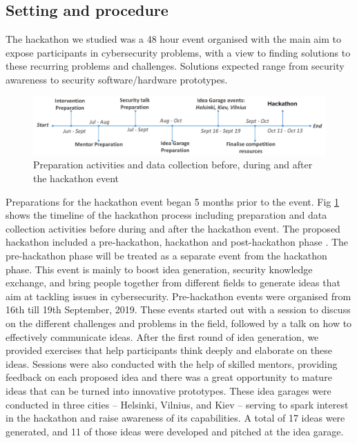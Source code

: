 \documentclass[runningheads]{llncs}
\begin{document}
\subsection{Setting and procedure}
The hackathon we studied was a 48 hour event organised with the main aim to expose participants in cybersecurity problems, with a view to finding solutions to these recurring problems and challenges. %
Solutions expected range from security awareness to security software/hardware prototypes. 
\begin{figure}[h]
  \centering
  \includegraphics[width=\linewidth]{timelinehack.pdf}
  \caption{Preparation activities and data collection before, during and after the hackathon event} \label{Fig:timeline} 
\end{figure}
Preparations for the hackathon event began 5 months prior to the event. Fig \ref{Fig:timeline} shows the timeline of the hackathon process including preparation and data collection activities before during and after the hackathon event. The proposed hackathon included a pre-hackathon, hackathon and post-hackathon phase \cite{komssi2014hackathons}. The pre-hackathon phase will be treated as a separate event from the hackathon phase. This event is mainly to boost idea generation, security knowledge exchange, and bring people together from different fields to generate ideas that aim at tackling issues in cybersecurity. Pre-hackathon events were organised from 16th till 19th September, 2019. These events started out with a session to discuss on the different challenges and problems in the field, followed by a talk on how to effectively communicate ideas. After the first round of idea generation, we provided exercises that help participants think deeply and elaborate on these ideas. Sessions were also conducted with the help of skilled mentors, providing feedback on each proposed idea and there was a great opportunity to mature ideas that can be turned into innovative prototypes. These idea garages were conducted in three cities -- Helsinki, Vilnius, and Kiev -- serving to spark interest in the hackathon and raise awareness of its capabilities. A total of 17 ideas were generated, and 11 of those ideas were developed and pitched at the idea garage. 
\end{document}
